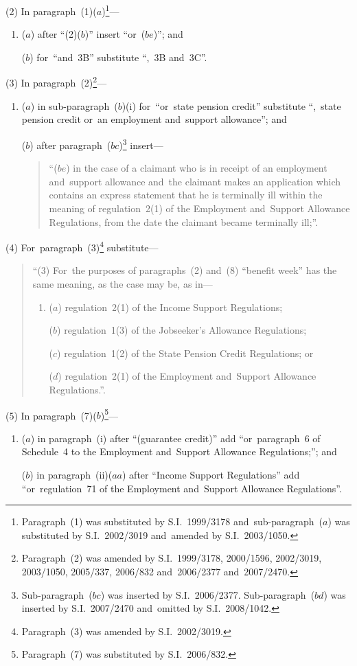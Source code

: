 \documentclass[12pt,a4paper]{article}
\begin{document}
(2) In paragraph~(1)($a$)\footnote{Paragraph~(1) was substituted by S.I.~1999/3178 and~sub-paragraph~($a$) was substituted by S.I.~2002/3019 and~amended by S.I.~2003/1050.}—
\begin{enumerate}\item[]
($a$) after “(2)($b$)” insert “or~($be$)”; and

($b$) for~“and~3B” substitute “,~3B and~3C”.
\end{enumerate}

(3) In paragraph~(2)\footnote{Paragraph~(2) was amended by S.I.~1999/3178, 2000/1596, 2002/3019, 2003/1050, 2005/337, 2006/832 and~2006/2377 and~2007/2470.}—
\begin{enumerate}\item[]
($a$) in sub-paragraph~($b$)(i)  for~“or~state pension credit” substitute “,~state pension credit or~an employment and~support allowance”; and

($b$) after paragraph~($bc$)\footnote{Sub-paragraph~($bc$)  was inserted by S.I.~2006/2377. Sub-paragraph~($bd$)  was inserted by S.I.~2007/2470 and~omitted by S.I.~2008/1042.} insert—
\begin{quotation}
“($be$) in the case of a claimant who is in receipt of an employment and~support allowance and~the claimant makes an application which contains an express statement that he is terminally ill within the meaning of regulation~2(1) of the Employment and~Support Allowance Regulations, from the date the claimant became terminally ill;”.
\end{quotation}
\end{enumerate}

(4) For~paragraph~(3)\footnote{Paragraph~(3) was amended by S.I.~2002/3019.} substitute—
\begin{quotation}
“(3) For~the purposes of paragraphs~(2) and~(8) “benefit week” has the same meaning, as the case may be, as in—
\begin{enumerate}\item[]
($a$) regulation~2(1) of the Income Support Regulations;

($b$) regulation~1(3) of the Jobseeker’s Allowance Regulations;

($c$) regulation~1(2) of the State Pension Credit Regulations; or

($d$) regulation~2(1) of the Employment and~Support Allowance Regulations.”.
\end{enumerate}
\end{quotation}

(5) In paragraph~(7)($b$)\footnote{Paragraph~(7) was substituted by S.I.~2006/832.}—
\begin{enumerate}\item[]
($a$) in paragraph~(i)  after “(guarantee credit)” add “or~paragraph~6 of Schedule~4 to the Employment and~Support Allowance Regulations;”; and

($b$) in paragraph~(ii)($aa$)  after “Income Support Regulations” add “or~regulation~71 of the Employment and~Support Allowance Regulations”.
\end{enumerate}
\end{document}
